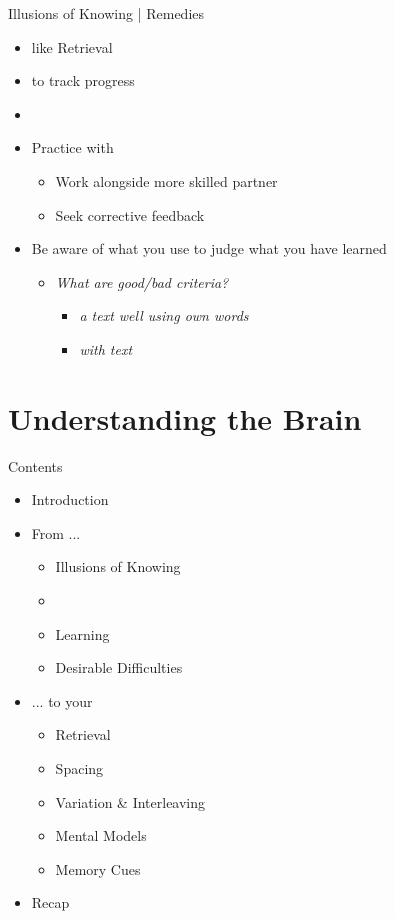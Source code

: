 \documentclass{ercisbeamer}
\begin{document}
\begin{frame}{Illusions of Knowing | Remedies}
    \begin{itemize}
        \item {} like Retrieval
        \item {} to track progress
        \item {}
        \item Practice with 
        \begin{itemize}
            \item Work alongside more skilled partner
            \item Seek corrective feedback
        \end{itemize}
        \item Be aware of what  you use to judge what you have learned
        \begin{itemize}
            \item \emph{What are good/bad criteria?} \pause
            \begin{itemize}
                \item \emph{ a text well using own words}
                \item \emph{ with text}
            \end{itemize}
        \end{itemize}
    \end{itemize}
\end{frame}

\section{Understanding the Brain}
\begin{frame}{Contents}
    \begin{itemize}
        \item Introduction
        \item From ...
        \begin{itemize}
            \item Illusions of Knowing
            \item {}
            \item Learning
            \item Desirable Difficulties
        \end{itemize}
        \item ... to your 
        \begin{itemize}
            \item Retrieval
            \item Spacing
            \item Variation \& Interleaving
            \item Mental Models
            \item Memory Cues
        \end{itemize}
        \item Recap
    \end{itemize}
\end{frame}
\end{document}
